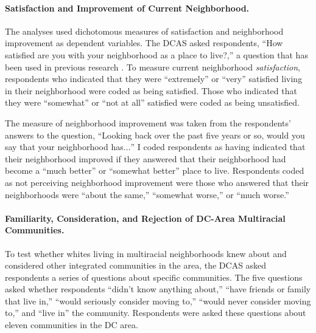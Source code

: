 \documentclass{baderart}
\begin{document}
\paragraph{Satisfaction and Improvement of Current Neighborhood.}
The analyses used dichotomous measures of satisfaction and neighborhood improvement as dependent variables. The DCAS asked respondents, ``How satisfied are you with your neighborhood as a place to live?,'' a question that has been used in previous research \citep[see, e.g.,][] {woldoff_effects_2002, greif_intersection_2015}. To measure current neighborhood \emph{satisfaction}, respondents who indicated that they were ``extremely'' or ``very'' satisfied living in their neighborhood were coded as being satisfied. Those who indicated that they were ``somewhat'' or ``not at all'' satisfied were coded as being unsatisfied.

The measure of neighborhood improvement was taken from the respondents' answers to the question, ``Looking back over the past five years or so, would you say that your neighborhood has\(\ldots\)'' I coded respondents as having indicated that their neighborhood improved if they answered that their neighborhood had become a ``much better'' or ``somewhat better'' place to live. Respondents coded as not perceiving neighborhood improvement were those who answered that their neighborhoods were ``about the same,'' ``somewhat worse,'' or ``much worse.''

\paragraph{Familiarity, Consideration, and Rejection of DC-Area Multiracial Communities.}

To test whether whites living in multiracial neighborhoods knew about and considered other integrated communities in the area, the DCAS asked respondents a series of questions about specific communities. The five questions asked whether respondents ``didn't know anything about,'' ``have friends or family that live in,'' ``would seriously consider moving to,'' ``would never consider moving to,'' and ``live in'' the community. Respondents were asked these questions about eleven communities in the DC area.
\end{document}
